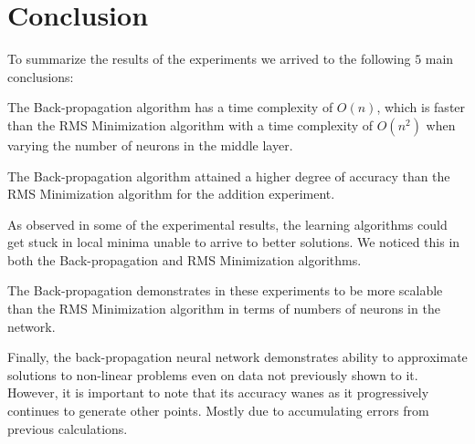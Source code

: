 \documentclass[11pt]{article}
\begin{document}


\section{Conclusion} %
\label{sec:conclusion}

To summarize the results of the experiments we arrived to the following $5$ main conclusions:

The Back-propagation algorithm has a time complexity of $O(n)$, which is faster than the RMS Minimization algorithm with a time
complexity of $O(n^{2})$ when varying the number of neurons in the middle layer.

The Back-propagation algorithm attained a higher degree of accuracy than the RMS Minimization algorithm for the addition experiment.

As observed in some of the experimental results, the learning algorithms could get stuck in local minima unable to arrive to better
solutions. We noticed this in both the Back-propagation and RMS Minimization algorithms.

The Back-propagation demonstrates in these experiments to be more scalable than the RMS Minimization algorithm in terms of numbers of
neurons in the network. 

Finally, the back-propagation neural network demonstrates ability to approximate solutions to non-linear problems even on data not
previously shown to it. However, it is important to note that its accuracy wanes as it progressively continues to generate other points.
Mostly due to accumulating errors from previous calculations.



\end{document}
